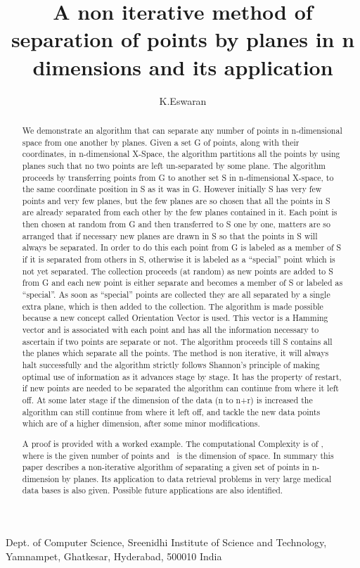 \documentclass[english]{article}
\newcommand{\lyxaddress}[1]{
\par {\raggedright #1
\vspace{1.4em}
\noindent\par}
}
\begin{document}
\title{A non iterative method of separation of points by planes in n dimensions and its
application}


\author{K.Eswaran}

\maketitle

\lyxaddress{Dept. of Computer Science, Sreenidhi Institute of Science and Technology,
Yamnampet, Ghatkesar, Hyderabad, 500010 India }
\begin{abstract}
We demonstrate an algorithm that can separate any number of points
in n-dimensional space from one another by planes. Given a set G of  points, along with their coordinates, in n-dimensional X-Space, the algorithm partitions all the  points by using planes such that no two points are left un-separated
by some plane. The algorithm proceeds by transferring points from G to another set S in n-dimensional X-space, to the same coordinate position in S as it was in G. However initially S has very few points and very few planes, but the few planes are so chosen that all the points in S are already separated from each other by the few planes contained in it.  Each point is then chosen at random from G and then transferred to S one by one, matters are so arranged that if necessary new planes are drawn in S so that the points in S will always be separated. In order to do this each point from G is labeled as a member of S if it is separated from others in S, otherwise it is labeled as a ``special'' 
point which is not yet separated. The collection proceeds (at random)
as new points are added to S from G and each new point is either separate and becomes a member of S or labeled as ``special''. As soon as  ``special'' points are collected
they are all separated by a single extra plane, which is then added to
the collection. The algorithm is made possible because a new concept
called Orientation Vector is used. This vector is a Hamming vector
and is associated with each point and has all the information necessary
to ascertain if two points are separate or not. The algorithm proceeds
till S contains all the planes which separate all the points. The
method is non iterative, it will always halt successfully and the
algorithm strictly follows Shannon's principle of making optimal use
of information as it advances stage by stage. It has the property
of restart, if new points are needed to be separated the algorithm
can continue from where it left off. At some later stage if the dimension
of the data (n to n+r) is increased the algorithm can still continue
from where it left off, and tackle the new data points which are of
a higher dimension, after some minor modifications. 

A proof is provided with a worked example. The computational Complexity
is of , where  is the given number
of points and \ is the dimension of space. In summary this paper
describes a non-iterative algorithm of separating a given set of points
in n-dimension by planes. Its application to data retrieval problems
in very large medical data bases is also given. Possible future applications are also identified.
\end{abstract}
\end{document}

